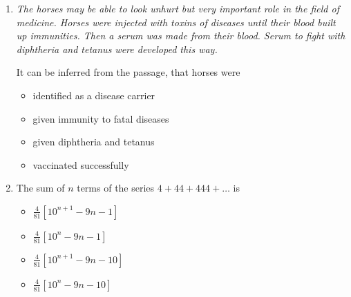 \documentclass[journal,12pt,onecolumn]{IEEEtran}
\theoremstyle{remark}
\begin{document}
\begin{enumerate}
\begin{multicols}{2}
\begin{itemize}[label=(A)]
    \item 100
    \item 110
    \item 90
    \item 95
\end{itemize}
\end{multicols}

 



 

\item    \hspace{0.5cm} \textit{The horses may be able to look unhurt but very important role in the field of medicine. Horses were injected with toxins of diseases until their blood built up immunities. Then a serum was made from their blood. Serum to fight with diphtheria and tetanus were developed this way.}

It can be inferred from the passage, that horses were  \hfill{}

\begin{multicols}{2}
\begin{itemize}[label=(A)]
    \item identified as a disease carrier
    \item given immunity to fatal diseases
    \item given diphtheria and tetanus
    \item vaccinated successfully
\end{itemize}
\end{multicols}
 

\item    \hspace{0.5cm} The sum of $n$ terms of the series $4+44+444+\ldots$ is  \hfill{}

\begin{multicols}{2}
\begin{itemize}[label=(A)]
    \item $\frac{4}{81} \left[10^{n+1} - 9n - 1 \right]$
    \item $\frac{4}{81} \left[10^{n} - 9n - 1 \right]$
    \item $\frac{4}{81} \left[10^{n+1} - 9n - 10 \right]$
    \item $\frac{4}{81} \left[10^n - 9n - 10 \right]$
\end{itemize}
\end{multicols}


\end{enumerate}
\end{document}
